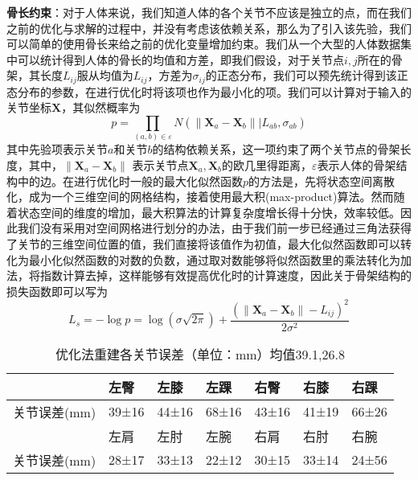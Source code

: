 \textbf{骨长约束}：对于人体来说，我们知道人体的各个关节不应该是独立的点，而在我们之前的优化与求解的过程中，并没有考虑该依赖关系，那么为了引入该先验，我们可以简单的使用骨长来给之前的优化变量增加约束。我们从一个大型的人体数据集中可以统计得到人体的骨长的均值和方差，即我们假设，对于关节点\(i,j\)所在的骨架，其长度\(L_{ij}\)服从均值为\(L_{ij}\)，方差为\(\sigma_{ij}\)的正态分布，我们可以预先统计得到该正态分布的参数，在进行优化时将该项也作为最小化的项。我们可以计算对于输入的关节坐标\(\bm{X}\)，其似然概率为
\begin{equation}
    p  = \prod _ { ( a,b ) \in \varepsilon } N \left( \left\| \boldsymbol {X} _ { a } - \boldsymbol {X} _ { b } \right\| | L _ {ab} , \sigma _ {ab} \right)
\end{equation}
其中先验项表示关节\(a\)和关节\(b\)的结构依赖关系，这一项约束了两个关节点的骨架长度，其中，\(\left\| \boldsymbol {X} _ { a } - \boldsymbol {X} _ { b } \right\|\) 表示关节点\(\boldsymbol {X} _ { a }, \boldsymbol {X} _ { b } \)的欧几里得距离，\(\varepsilon\)表示人体的骨架结构中的边。在进行优化时一般的最大化似然函数\(p\)的方法是，先将状态空间离散化，成为一个三维空间的网格结构，接着使用最大积(max-product)算法\cite{max-product}。然而随着状态空间的维度的增加，最大积算法的计算复杂度增长得十分快，效率较低。因此我们没有采用对空间网格进行划分的办法，由于我们前一步已经通过三角法获得了关节的三维空间位置的值，我们直接将该值作为初值，最大化似然函数即可以转化为最小化似然函数的对数的负数，通过取对数能够将似然函数里的乘法转化为加法，将指数计算去掉，这样能够有效提高优化时的计算速度，因此关于骨架结构的损失函数即可以写为
\begin{equation}
    L_{s} = -\log p = \log (\sigma \sqrt{2\pi}) + \frac{(\left\| \boldsymbol {X} _ { a } - \boldsymbol {X} _ { b } \right\| - L_{ij})^2}{2\sigma^2}
\end{equation}

\begin{table}[H]
    \centering
    \begin{tabular}{lllllll}
        \hline
                     & 左臀  & 左膝  & 左踝  & 右臀  & 右膝  & 右踝  \\
        \hline
        关节误差(mm) & 39±16 & 44±16 & 68±16 & 43±16 & 41±19 & 66±26 \\
                     & 左肩  & 左肘  & 左腕  & 右肩  & 右肘  & 右腕  \\
        关节误差(mm) & 28±17 & 33±13 & 22±12 & 30±15 & 33±14 & 24±56 \\
        \hline
    \end{tabular}
    \caption{优化法重建各关节误差（单位：mm）均值39.1,26.8\label{tab:3derroropt}}
\end{table}

